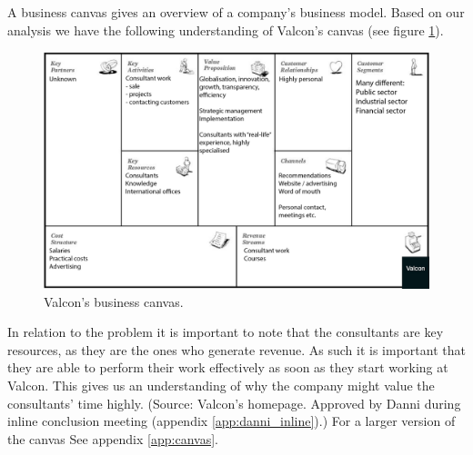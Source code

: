 A business canvas gives an overview of a company's business model.
Based on our analysis we have the following understanding of Valcon's canvas (see figure \ref{fig:canvas}).

\begin{figure}[!htp]
\centering
\includegraphics[width=\textwidth]{inline/business-model-canvas.png}
\caption{Valcon's business canvas.}
\label{fig:canvas}
\end{figure}

In relation to the problem it is important to note that the consultants are key resources, as they are the ones who generate revenue.
As such it is important that they are able to perform their work effectively as soon as they start working at Valcon. This gives us an understanding of why the company might value the consultants' time highly. (Source: Valcon's homepage. Approved by Danni during inline conclusion meeting (appendix \ref{app:danni_inline}).) 
For a larger version of the canvas See appendix \ref{app:canvas}.